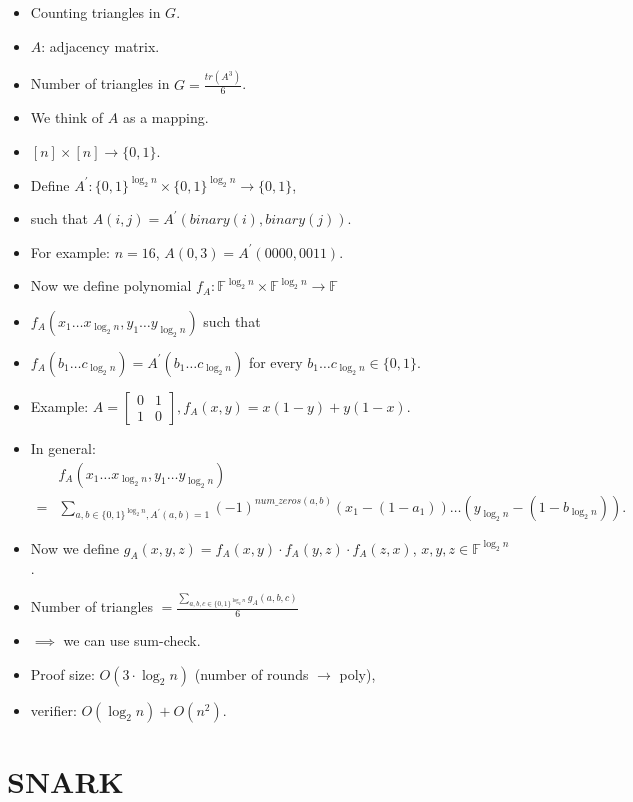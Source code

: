 \documentclass[a4paper, 12pt]{book}
\theoremstyle{definition}
\theoremstyle{remark}
\newcommand{\F}{\mathbb{F}}
\begin{document}
\begin{itemize}[label={}]
  \item Counting triangles in $G$.
  \item $A$: adjacency matrix.
  \item Number of triangles in $G = \frac{tr\left(A^3\right)}{6}$.
  \item We think of $A$ as a mapping.
  \item $[n] \times [n] \to \{0, 1\}$.
  \item Define $A^{'}: \{0, 1\}^{\log_2 n} \times \{0, 1\}^{\log_2 n} \to \{0, 1\}$,
  \item such that $A(i, j) = A^{'}(binary(i), binary(j))$.
  \item For example: $n=16$, $A(0, 3) = A^{'}(0000, 0011)$.
  \item Now we define polynomial $f_A: \F^{\log_2 n} \times \F^{\log_2 n} \to \F$
  \item $f_A(x_1 \dots x_{\log_2 n}, y_1 \dots y_{\log_2 n})$ such that
  \item $f_A(b_1 \dots c_{\log_2 n}) = A^{'}(b_1 \dots c_{\log_2 n})$ for every $b_1 \dots c_{\log_2 n} \in \{0, 1\}$.
  \item Example: $A = \begin{bmatrix}0 & 1 \\ 1 & 0\end{bmatrix}, f_A(x, y) = x(1-y) + y(1-x)$.
  \item In general:
    \begin{align*}
      &f_A(x_1 \dots x_{\log_2 n}, y_1 \dots y_{\log_2 n}) \\
      = &\sum_{a,b \in \{0, 1\}^{\log_2 n}, A^{'}(a,b)=1} (-1)^{num\_zeros(a,b)}
      (x_1 - (1 - a_1)) \dots (y_{\log_2 n} - (1 - b_{\log_2 n})).
    \end{align*}
  \item Now we define $g_A(x, y, z) = f_A(x, y) \cdot f_A(y, z) \cdot f_A(z, x)$, $x, y, z \in \F^{\log_2 n}$.
  \item Number of triangles $= \frac{\sum_{a, b, c \in \{0, 1\}^{\log_2 n}} g_A(a, b, c)}{6}$
  \item $\implies$ we can use sum-check.
  \item Proof size: $O(3 \cdot \log_2 n)$ (number of rounds $\to$ poly),
  \item verifier: $O(\log_2 n) + O\left(n^2\right)$.
\end{itemize}


\section{SNARK}
\end{document}
